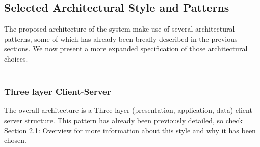 \subsection{Selected Architectural Style and Patterns}
The proposed architecture of the system make use of several architectural patterns, some of which has already been breafly described in the previous sections. We now present a more expanded specification of those architectural choices.\\\\
\subsubsection{Three layer Client-Server}
The overall architecture is a Three layer (presentation, application, data) client-server structure. This pattern has already been previously detailed, so check Section 2.1: Overview for more information about this style and why it has been chosen.
